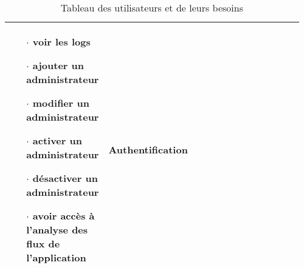 \begin{table}
\begin{tabular}{|p{0.21\linewidth}|p{0.54\linewidth}|p{0.21\linewidth}|}
\begin{itemize}
                                \item[$\cdot$]  voir les logs
                                \item[$\cdot$]  ajouter un administrateur
                                \item[$\cdot$]  modifier un administrateur
                                \item[$\cdot$]  activer un administrateur
                                \item[$\cdot$]  désactiver un administrateur
                                \item[$\cdot$]  avoir accès à l'analyse des flux de l'application 
                        \end{itemize} & 
                        Authentification \\
                \hline  
        \end{tabular}
        \caption{Tableau des utilisateurs et de leurs besoins} \label{tab:sometab}
\end{table}
\par